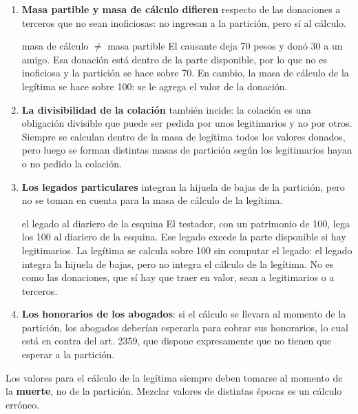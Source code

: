 \documentclass[12pt,oneside]{book}
\begin{document}
\begin{enumerate}
    \item \textbf{Masa partible y masa de cálculo difieren} respecto de las donaciones a terceros que no sean inoficiosas: no ingresan a la partición, pero sí al cálculo.

\begin{example}{masa de cálculo $\neq$ masa partible}
El causante deja 70 pesos y donó 30 a un amigo. Esa donación está dentro de la parte disponible, por lo que no es inoficiosa y la partición se hace sobre 70. En cambio, la masa de cálculo de la legítima se hace sobre 100: se le agrega el valor de la donación.
\end{example}

    \item \textbf{La divisibilidad de la colación} también incide: la colación es una obligación divisible que puede ser pedida por unos legitimarios y no por otros. Siempre se calculan dentro de la masa de legítima todos los valores donados, pero luego se forman distintas masas de partición según los legitimarios hayan o no pedido la colación.
    \item \textbf{Los legados particulares} integran la hijuela de bajas de la partición, pero no se toman en cuenta para la masa de cálculo de la legítima.

\begin{example}{el legado al diariero de la esquina}
El testador, con un patrimonio de 100, lega los 100 al diariero de la esquina. Ese legado excede la parte disponible si hay legitimarios. La legítima se calcula sobre 100 sin computar el legado: el legado integra la hijuela de bajas, pero no integra el cálculo de la legítima. No es como las donaciones, que sí hay que traer en valor, sean a legitimarios o a terceros.
\end{example}

    \item \textbf{Los honorarios de los abogados}: si el cálculo se llevara al momento de la partición, los abogados deberían esperarla para cobrar sus honorarios, lo cual está en contra del art. 2359, que dispone expresamente que no tienen que esperar a la partición.
\end{enumerate}

\begin{important}
Los valores para el cálculo de la legítima siempre deben tomarse al momento de la \textbf{muerte}, no de la partición. Mezclar valores de distintas épocas es un cálculo erróneo.
\end{important}
\end{document}
